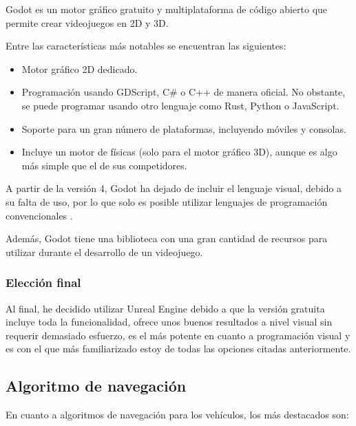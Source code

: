 \documentclass[a4paper,11pt]{book}
\begin{document}
Godot \cite{godot} es un motor gráfico gratuito y multiplataforma de código abierto que permite crear videojuegos en 2D y 3D. 

\bigskip

Entre las características más notables se encuentran las siguientes:

\begin{itemize}
   \item Motor gráfico 2D dedicado. 
   \item Programación usando GDScript, C\# o C++ de manera oficial. No obstante, se puede programar usando otro lenguaje como Rust, Python o JavaScript. 
   \item Soporte para un gran número de plataformas, incluyendo móviles y consolas.
   \item Incluye un motor de físicas (solo para el motor gráfico 3D), aunque es algo más simple que el de sus competidores.
\end{itemize}

\bigskip 

A partir de la versión 4, Godot ha dejado de incluir el lenguaje visual, debido a su falta de uso, por lo que solo es posible utilizar lenguajes de programación convencionales \cite{godot-no-visual}.

\bigskip

Además, Godot tiene una biblioteca con una gran cantidad de recursos para utilizar durante el desarrollo de un videojuego.


\subsubsection{Elección final}

Al final, he decidido utilizar Unreal Engine debido a que la versión gratuita incluye toda la funcionalidad, ofrece unos buenos resultados a nivel visual sin requerir demasiado esfuerzo, es el más potente en cuanto a programación visual y es con el que más familiarizado estoy de todas las opciones citadas anteriormente.

\subsection{Algoritmo de navegación}
En cuanto a algoritmos de navegación para los vehículos, los más destacados son:
\end{document}
